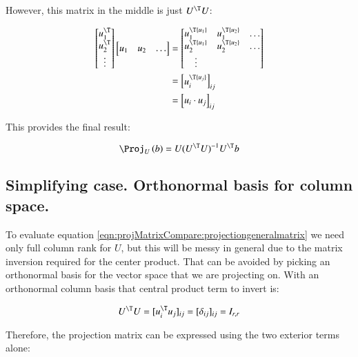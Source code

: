 However, this matrix in the middle is just $U^\T U$:

\begin{align*}
\begin{bmatrix}
u_1^\T \\
u_2^\T \\
\vdots \\
\end{bmatrix}
\begin{bmatrix}
{u_1} & {u_2} & \hdots \\
\end{bmatrix}
&=
\begin{bmatrix}
u_1^\T {u_1} & u_1^\T {u_2} & \hdots \\
u_2^\T {u_1} & u_2^\T {u_2} & \hdots \\
\vdots & & \\
\end{bmatrix} \\
&=
{
\begin{bmatrix}
u_i^\T {u_j}
\end{bmatrix}
}_{ij} \\
&=
{
\begin{bmatrix}
{u_i} \cdot {u_j}
\end{bmatrix}
}_{ij} \\
\end{align*}

This provides the final result:

\begin{equation}\label{eqn:projMatrixCompare:projectiongeneralmatrix}
\Proj_{U}\left(b\right) = U (U^\T U)^{-1} U^\T b
\end{equation}

\subsection{Simplifying case.  Orthonormal basis for column space. }

To evaluate equation \ref{eqn:projMatrixCompare:projectiongeneralmatrix} we need only full column rank for $U$, but this will be messy in general due to the matrix inversion required for the center product.  That can be avoided by picking an orthonormal basis for the vector space that we are projecting on.  With an orthonormal column basis that 
central product term to invert is:

\[
U^\T U = [ u_i^\T u_j ]_{ij} = [ \delta_{ij} ]_{ij} = I_{r,r}
\]

Therefore, the projection matrix can be expressed using the two exterior terms alone:

